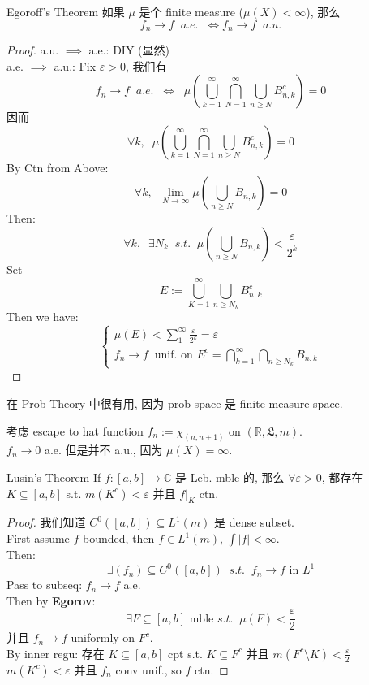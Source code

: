 \documentclass[lang=cn,11pt]{elegantbook}
\begin{document}
\begin{theorem}{Egoroff's Theorem}
\label{Egoroff's Theorem}
如果 $\mu$ 是个 finite measure ($\mu(X) < \infty$), 那么 
\[
f_n \rightarrow f \;\;a.e. \;\; \Longleftrightarrow f_n \rightarrow f \;\; a.u.
\]
\end{theorem}
\begin{proof}
    a.u. $\implies$ a.e.: DIY (显然)\\
    a.e. $\implies$ a.u.: Fix $\varepsilon > 0$, 我们有 \[
    f_n \rightarrow f \;\; a.e. \;\; \Longleftrightarrow \;\; \mu( \bigcup_{k=1}^\infty \bigcap_{N=1}^\infty \bigcup_{n \geq N} B_{n,k}^c)  = 0
    \]
    因而 \[
    \forall k, \;\; \mu( \bigcup_{k=1}^\infty \bigcap_{N=1}^\infty \bigcup_{n \geq N} B_{n,k}^c) =0 
    \]
    By Ctn from Above: \[
    \forall k,\;\;  \lim_{N\rightarrow \infty} \mu(\bigcup_{n\geq N} B_{n,k}) = 0
    \]
    Then: \[
    \forall k,\;\; \exists N_k \;\;s.t. \;\;  \mu(\bigcup_{n\geq N} B_{n,k}) < \frac{\varepsilon}{2^k}
    \]
    Set\[
    E:= \bigcup_{K=1}^\infty \bigcup_{n\geq N_k} B_{n,k}^c
    \]
    Then we have: \[
    \begin{cases}
        \mu(E) < \sum_{1}^\infty \frac{\varepsilon}{2^k} = \varepsilon \\
        f_n \rightarrow f \;\;\text{unif. on } E^c = \bigcap_{k=1}^\infty \bigcap_{n\geq N_k} B_{n,k}
    \end{cases}
    \]
\end{proof}
\begin{remark}
    在 Prob Theory 中很有用, 因为 prob space 是 finite measure space.
\end{remark}

\begin{example}
    考虑 escape to hat function $f_n := \chi_{(n,n+1)}$ on $(\mathbb{R}, \mathfrak{L},m)$.\\
    $f_n \rightarrow 0$ a.e. 但是并不 a.u., 因为 $\mu(X) = \infty$.
\end{example}




\begin{theorem}{Lusin's Theorem}
\label{Lusin's Theorem}
    If $f: [a,b] \rightarrow \mathbb{C}$ 是 Leb. mble 的, 那么 $\forall \varepsilon > 0$, 都存在 $K \subseteq [a,b]$ s.t. $m(K^c) < \varepsilon$ 并且 $f|_K$ ctn.
\end{theorem}
\begin{proof}
我们知道 $C^0([a,b]) \subseteq L^1(m)$ 是 dense subset.\\
First assume $f$ bounded, then $f\in L^1(m)$, $\int|f| < \infty$.\\
Then: \[\exists (f_n)  \subseteq C^0([a,b])  \;\;s.t. \;\; f_n\rightarrow f \text{ in } L^1 \]
Pass to subseq: $f_n\rightarrow f$ a.e.\\
Then by \textbf{Egorov}: \[
\exists F \subseteq [a,b] \text{ mble } s.t. \;\; \mu(F) < \frac{\varepsilon}{2}
\]
并且 $f_n \rightarrow f$ uniformly on $F^c$.\\
By inner regu: 存在 $K \subseteq [a,b] $ cpt s.t. $K \subseteq F^c$ 并且 $m(F^c \setminus K ) < \frac{\varepsilon}{2}$
$m(K^c) < \varepsilon$ 并且 $f_n$ conv unif., so $f$ ctn.
\end{proof}
\end{document}
